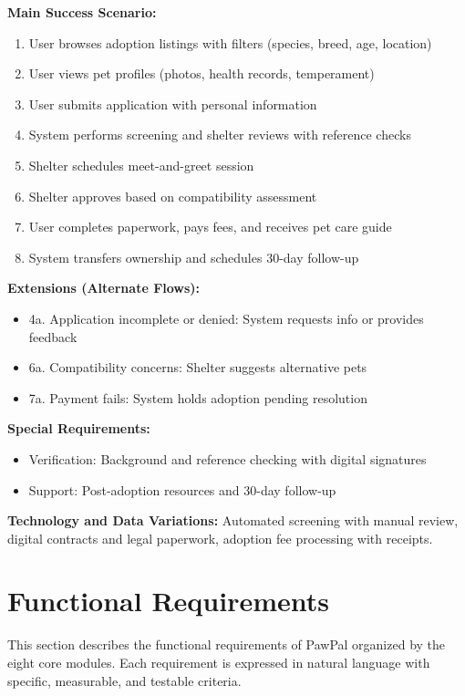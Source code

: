 \textbf{Main Success Scenario:}
\begin{enumerate}
    \item User browses adoption listings with filters (species, breed, age, location)
    \item User views pet profiles (photos, health records, temperament)
    \item User submits application with personal information
    \item System performs screening and shelter reviews with reference checks
    \item Shelter schedules meet-and-greet session
    \item Shelter approves based on compatibility assessment
    \item User completes paperwork, pays fees, and receives pet care guide
    \item System transfers ownership and schedules 30-day follow-up
\end{enumerate}

\textbf{Extensions (Alternate Flows):}
\begin{itemize}
    \item 4a. Application incomplete or denied: System requests info or provides feedback
    \item 6a. Compatibility concerns: Shelter suggests alternative pets
    \item 7a. Payment fails: System holds adoption pending resolution
\end{itemize}

\textbf{Special Requirements:}
\begin{itemize}
    \item Verification: Background and reference checking with digital signatures
    \item Support: Post-adoption resources and 30-day follow-up
\end{itemize}

\textbf{Technology and Data Variations:} Automated screening with manual review, digital contracts and legal paperwork, adoption fee processing with receipts.

\section{Functional Requirements}
This section describes the functional requirements of PawPal organized by the eight core modules. Each requirement is expressed in natural language with specific, measurable, and testable criteria.

